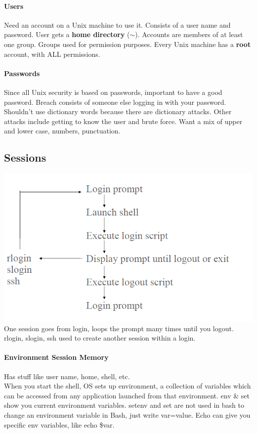 \documentclass[12 pt]{article}
\begin{document}
	\paragraph{Users} Need an account on a Unix machine to use it. Consists of a user name and password. User gets a \textbf{home directory} ($\sim$). Accounts are members of at least one group. Groups used for permission purposes. Every Unix machine has a \textbf{root} account, with ALL permissions.
	\paragraph{Passwords} Since all Unix security is based on passwords, important to have a good password. Breach consists of someone else logging in with your password. Shouldn't use dictionary words because there are dictionary attacks. Other attacks include getting to know the user and brute force. Want a mix of upper and lower case, numbers, punctuation.
	\subsection{Sessions} \includegraphics[scale=0.5]{ses} One session goes from login, loops the prompt many times until you logout. rlogin, slogin, ssh used to create another session within a login.
	\paragraph{Environment Session Memory} Has stuff like user name, home, shell, etc.
	\\ When you start the shell, OS sets up environment, a collection of variables which can be accessed from any application launched from that environment. env \& set show you current environment variables. setenv and set are not used in bash to change an environment variable in Bash, just write var=value. Echo can give you specific env variables, like echo \$var.
\end{document}
